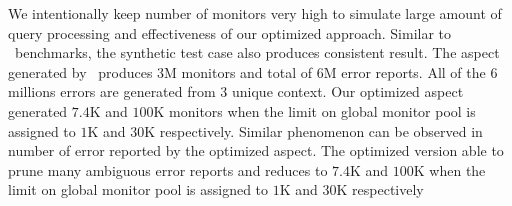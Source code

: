 We intentionally keep number of monitors very high
to simulate large amount of query processing and effectiveness of our optimized
approach. Similar to \dacapo\ benchmarks, the synthetic test case also produces
consistent result. The aspect generated by \javamop\ produces $3$M monitors and
total of $6$M error reports. All of the $6$ millions errors are generated from
$3$ unique context. Our optimized aspect generated $7.4$K and $100$K monitors
when the limit on global monitor pool is assigned to $1$K and $30$K respectively.
Similar phenomenon can be observed in number of error reported by the optimized
aspect. The optimized version able to prune many ambiguous error reports and
reduces to $7.4$K and $100$K when the limit on global monitor pool is assigned to
$1$K and $30$K respectively

